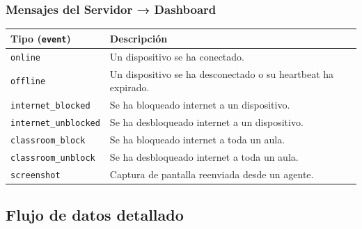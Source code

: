 \documentclass[12pt, a4paper, twoside]{article}
\begin{document}
\subsubsection{Mensajes del Servidor → Dashboard}

\begin{longtable}{lp{9cm}}
  \toprule
  \textbf{Tipo (\texttt{event})} & \textbf{Descripción} \\
  \midrule
  \texttt{online} & Un dispositivo se ha conectado. \\
  \texttt{offline} & Un dispositivo se ha desconectado o su heartbeat ha expirado. \\
  \texttt{internet\_blocked} & Se ha bloqueado internet a un dispositivo. \\
  \texttt{internet\_unblocked} & Se ha desbloqueado internet a un dispositivo. \\
  \texttt{classroom\_block} & Se ha bloqueado internet a toda un aula. \\
  \texttt{classroom\_unblock} & Se ha desbloqueado internet a toda un aula. \\
  \texttt{screenshot} & Captura de pantalla reenviada desde un agente. \\
  \bottomrule
\end{longtable}

\subsection{Flujo de datos detallado}
\end{document}
